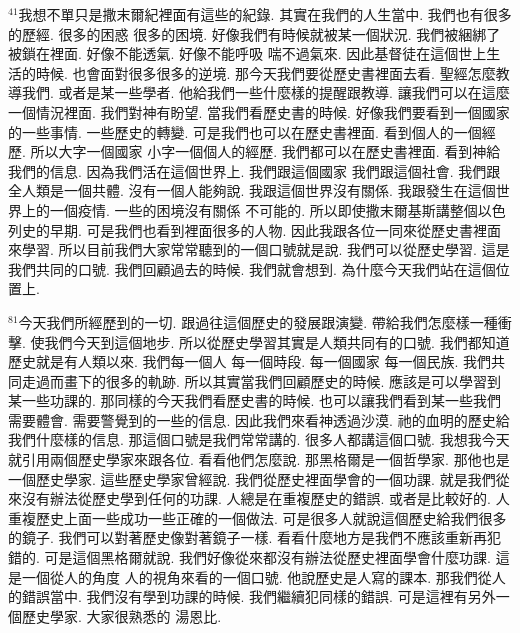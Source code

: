 \documentclass{book}
\begin{document}
$^{41}$我想不單只是撒末爾紀裡面有這些的紀錄.
其實在我們的人生當中.
我們也有很多的歷經.
很多的困惑 很多的困境.
好像我們有時候就被某一個狀況.
我們被綑綁了 被鎖在裡面.
好像不能透氣.
好像不能呼吸 喘不過氣來.
因此基督徒在這個世上生活的時候.
也會面對很多很多的逆境.
那今天我們要從歷史書裡面去看.
聖經怎麼教導我們.
或者是某一些學者.
他給我們一些什麼樣的提醒跟教導.
讓我們可以在這麼一個情況裡面.
我們對神有盼望.
當我們看歷史書的時候.
好像我們要看到一個國家的一些事情.
一些歷史的轉變.
可是我們也可以在歷史書裡面.
看到個人的一個經歷.
所以大字一個國家 小字一個個人的經歷.
我們都可以在歷史書裡面.
看到神給我們的信息.
因為我們活在這個世界上.
我們跟這個國家 我們跟這個社會.
我們跟全人類是一個共體.
沒有一個人能夠說.
我跟這個世界沒有關係.
我跟發生在這個世界上的一個疫情.
一些的困境沒有關係 不可能的.
所以即使撒末爾基斯講整個以色列史的早期.
可是我們也看到裡面很多的人物.
因此我跟各位一同來從歷史書裡面來學習.
所以目前我們大家常常聽到的一個口號就是說.
我們可以從歷史學習.
這是我們共同的口號.
我們回顧過去的時候.
我們就會想到.
為什麼今天我們站在這個位置上.

$^{81}$今天我們所經歷到的一切.
跟過往這個歷史的發展跟演變.
帶給我們怎麼樣一種衝擊.
使我們今天到這個地步.
所以從歷史學習其實是人類共同有的口號.
我們都知道歷史就是有人類以來.
我們每一個人 每一個時段.
每一個國家 每一個民族.
我們共同走過而畫下的很多的軌跡.
所以其實當我們回顧歷史的時候.
應該是可以學習到某一些功課的.
那同樣的今天我們看歷史書的時候.
也可以讓我們看到某一些我們需要體會.
需要警覺到的一些的信息.
因此我們來看神透過沙漠.
祂的血明的歷史給我們什麼樣的信息.
那這個口號是我們常常講的.
很多人都講這個口號.
我想我今天就引用兩個歷史學家來跟各位.
看看他們怎麼說.
那黑格爾是一個哲學家.
那他也是一個歷史學家.
這些歷史學家曾經說.
我們從歷史裡面學會的一個功課.
就是我們從來沒有辦法從歷史學到任何的功課.
人總是在重複歷史的錯誤.
或者是比較好的.
人重複歷史上面一些成功一些正確的一個做法.
可是很多人就說這個歷史給我們很多的鏡子.
我們可以對著歷史像對著鏡子一樣.
看看什麼地方是我們不應該重新再犯錯的.
可是這個黑格爾就說.
我們好像從來都沒有辦法從歷史裡面學會什麼功課.
這是一個從人的角度 人的視角來看的一個口號.
他說歷史是人寫的課本.
那我們從人的錯誤當中.
我們沒有學到功課的時候.
我們繼續犯同樣的錯誤.
可是這裡有另外一個歷史學家.
大家很熟悉的 湯恩比.
\end{document}
